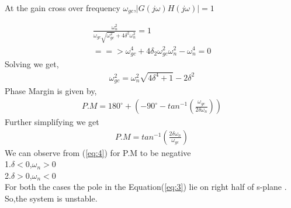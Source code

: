 \begin{enumerate}[label=\thesection.\arabic*.,ref=\thesection.\theenumi]
At the gain cross over frequency $\omega_{gc}$,$|G(j\omega)H(j\omega)|=1$ 

\begin{align}
\frac{\omega_{n}^{2}}{\omega_{gc}\sqrt{\omega_{gc}^{2}}+4\delta^{2}\omega_{n}^{2}} =1 
\\
==> \omega_{gc}^{4} +4 \delta_{2} \omega_{gc}^{2} \omega_{n}^{2}-\omega_{n}^{4}=0
\end{align}
Solving we get,
\begin{align}
\omega_{gc}^{2}=\omega_{n}^{2} \sqrt{4\delta^{4}+1} - 2 \delta^{2}
\end{align}
Phase Margin is given by,
\begin{align}
P.M=180^{\circ}+(-90^{\circ}-tan^{-1}(\frac{\omega_{gc}}{2\delta \omega_{n}}))
\end{align}
Further simplifying we get
\begin{align}
P.M=tan^{-1}(\frac{2\delta \omega_{n}}{\omega_{gc}}) \label{eq:4}
\end{align}
We can observe from (\ref{eq:4}) for P.M to be negative \\
1.$\delta <0$,$\omega_{n} >0$  \\
2.$\delta >0$,$\omega_{n} <0$   \\
For both the cases the pole in the Equation(\ref{eq:3}) lie on right half of s-plane . So,the system is unstable.











\end{enumerate}
